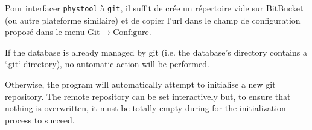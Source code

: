 \begin{theory}[title=Intégration à git]
	Pour interfacer \verb|phystool| à \verb|git|, il suffit de crée un
	répertoire vide sur BitBucket (ou autre plateforme similaire) et de copier
	l'url dans le champ de configuration proposé dans le menu $\mathrm{Git} \to
	\mathrm{Configure}$.

    If the database is already managed by git (i.e. the database's directory
    contains a `.git` directory), no automatic action will be performed.

    Otherwise, the program will automatically attempt to initialise a new git
    repository. The remote repository can be set interactively but, to ensure that
    nothing is overwritten, it must be totally empty during for the initialization
    process to succeed. 
\end{theory}
